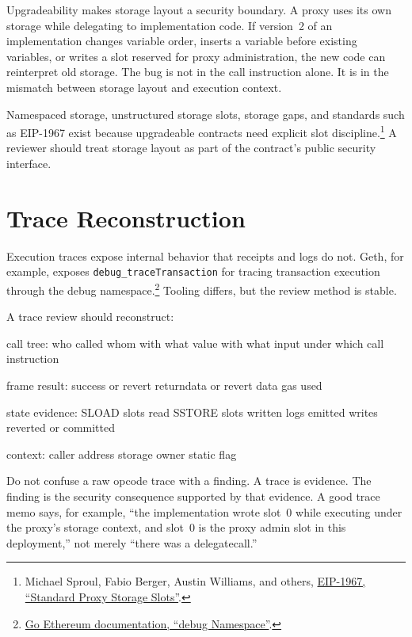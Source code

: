 Upgradeability makes storage layout a security boundary. A proxy uses its own storage while delegating to implementation code. If version~2 of an implementation changes variable order, inserts a variable before existing variables, or writes a slot reserved for proxy administration, the new code can reinterpret old storage. The bug is not in the call instruction alone. It is in the mismatch between storage layout and execution context.

Namespaced storage, unstructured storage slots, storage gaps, and standards such as EIP-1967 exist because upgradeable contracts need explicit slot discipline.\footnote{Michael Sproul, Fabio Berger, Austin Williams, and others, \href{https://eips.ethereum.org/EIPS/eip-1967}{EIP-1967, ``Standard Proxy Storage Slots''}.} A reviewer should treat storage layout as part of the contract's public security interface.

\section{Trace Reconstruction}

Execution traces expose internal behavior that receipts and logs do not. Geth, for example, exposes \texttt{debug\_traceTransaction} for tracing transaction execution through the debug namespace.\footnote{\href{https://geth.ethereum.org/docs/interacting-with-geth/rpc/ns-debug}{Go Ethereum documentation, ``debug Namespace''}.} Tooling differs, but the review method is stable.

A trace review should reconstruct:

\begin{codeblock}
call tree:
    who called whom
    with what value
    with what input
    under which call instruction

frame result:
    success or revert
    returndata or revert data
    gas used

state evidence:
    SLOAD slots read
    SSTORE slots written
    logs emitted
    writes reverted or committed

context:
    caller
    address
    storage owner
    static flag
\end{codeblock}

Do not confuse a raw opcode trace with a finding. A trace is evidence. The finding is the security consequence supported by that evidence. A good trace memo says, for example, ``the implementation wrote slot~0 while executing under the proxy's storage context, and slot~0 is the proxy admin slot in this deployment,'' not merely ``there was a delegatecall.''

